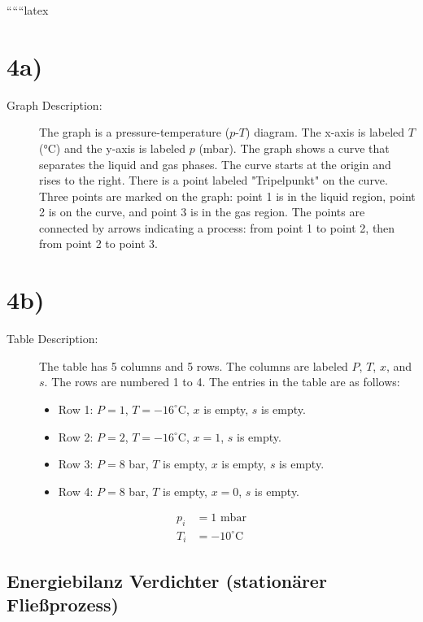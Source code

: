 
``````latex


\section*{4a)}

\begin{description}
    \item[Graph Description:] The graph is a pressure-temperature ($p$-$T$) diagram. The x-axis is labeled $T$ (°C) and the y-axis is labeled $p$ (mbar). The graph shows a curve that separates the liquid and gas phases. The curve starts at the origin and rises to the right. There is a point labeled "Tripelpunkt" on the curve. Three points are marked on the graph: point 1 is in the liquid region, point 2 is on the curve, and point 3 is in the gas region. The points are connected by arrows indicating a process: from point 1 to point 2, then from point 2 to point 3.
\end{description}

\section*{4b)}

\begin{description}
    \item[Table Description:] The table has 5 columns and 5 rows. The columns are labeled $P$, $T$, $x$, and $s$. The rows are numbered 1 to 4. The entries in the table are as follows:
    \begin{itemize}
        \item Row 1: $P = 1$, $T = -16^\circ$C, $x$ is empty, $s$ is empty.
        \item Row 2: $P = 2$, $T = -16^\circ$C, $x = 1$, $s$ is empty.
        \item Row 3: $P = 8$ bar, $T$ is empty, $x$ is empty, $s$ is empty.
        \item Row 4: $P = 8$ bar, $T$ is empty, $x = 0$, $s$ is empty.
    \end{itemize}
\end{description}

\begin{align*}
    p_i &= 1 \text{ mbar} \\
    T_i &= -10^\circ \text{C}
\end{align*}

\subsection*{Energiebilanz Verdichter (stationärer Fließprozess)}

